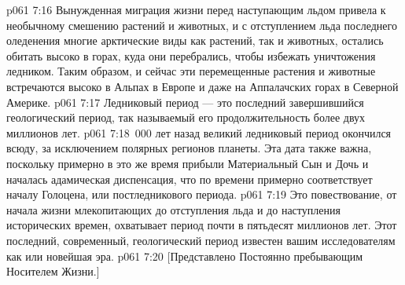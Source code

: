 \vs p061 7:16 Вынужденная миграция жизни перед наступающим льдом привела к необычному смешению растений и животных, и с отступлением льда последнего оледенения многие арктические виды как растений, так и животных, остались обитать высоко в горах, куда они перебрались, чтобы избежать уничтожения ледником. Таким образом, и сейчас эти перемещенные растения и животные встречаются высоко в Альпах в Европе и даже на Аппалачских горах в Северной Америке.
\vs p061 7:17 \pc Ледниковый период --- это последний завершившийся геологический период, так называемый  его продолжительность более двух миллионов лет.
\vs p061 7:18 \,000 лет назад великий ледниковый период окончился всюду, за исключением полярных регионов планеты. Эта дата также важна, поскольку примерно в это же время прибыли Материальный Сын и Дочь и началась адамическая диспенсация, что по времени примерно соответствует началу Голоцена, или постледникового периода.
\vs p061 7:19 \pc Это повествование, от начала жизни млекопитающих до отступления льда и до наступления исторических времен, охватывает период почти в пятьдесят миллионов лет. Этот последний, современный, геологический период известен вашим исследователям как  или новейшая эра.
\vsetoff
\vs p061 7:20 [Представлено Постоянно пребывающим Носителем Жизни.]
